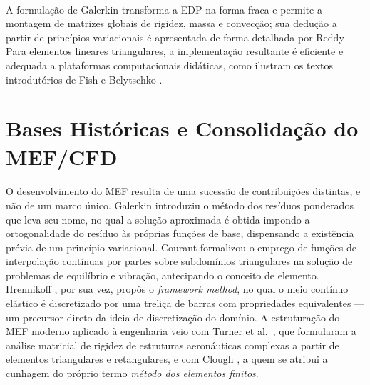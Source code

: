 \paragraph{}A formulação de Galerkin transforma a EDP na forma fraca e permite a montagem de matrizes globais de rigidez, massa e convecção; sua dedução a partir de princípios variacionais é apresentada de forma detalhada por Reddy \cite{Reddy2005}. Para elementos lineares triangulares, a implementação resultante é eficiente e adequada a plataformas computacionais didáticas, como ilustram os textos introdutórios de Fish e Belytschko \cite{Fish2007}.

\section{Bases Históricas e Consolidação do MEF/CFD}

\paragraph{}O desenvolvimento do MEF resulta de uma sucessão de contribuições distintas, e não de um marco único. Galerkin \cite{Galerkin1915} introduziu o método dos resíduos ponderados que leva seu nome, no qual a solução aproximada é obtida impondo a ortogonalidade do resíduo às próprias funções de base, dispensando a existência prévia de um princípio variacional. Courant \cite{Courant1943} formalizou o emprego de funções de interpolação contínuas por partes sobre subdomínios triangulares na solução de problemas de equilíbrio e vibração, antecipando o conceito de elemento. Hrennikoff \cite{Hrennikoff1941}, por sua vez, propôs o \textit{framework method}, no qual o meio contínuo elástico é discretizado por uma treliça de barras com propriedades equivalentes --- um precursor direto da ideia de discretização do domínio. A estruturação do MEF moderno aplicado à engenharia veio com Turner et al.\ \cite{Turner1956}, que formularam a análise matricial de rigidez de estruturas aeronáuticas complexas a partir de elementos triangulares e retangulares, e com Clough \cite{Clough1960}, a quem se atribui a cunhagem do próprio termo \textit{método dos elementos finitos}.

